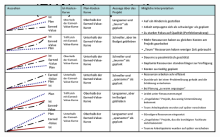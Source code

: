 \documentclass[11pt,a4paper]{article}
\begin{document}
\begin{figure}[H]
	\centering
	\includegraphics[width=\textwidth]{ch11/eva}
\end{figure}
\end{document}
